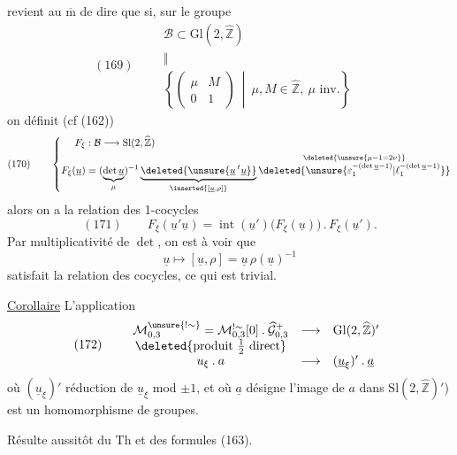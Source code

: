  revient au $\overline{\mathrm m}$ de dire que si,
sur le groupe
\[
(169)\qquad
\begin{array}{ll}
\mathcal B\subset\mathrm{Gl}(2,\widehat{\mathbb Z})&\\
\Vert&\\[-2pt]
\left\{\begin{pmatrix}\mu&M\\0&1\end{pmatrix}
\ \middle|\ \mu,M\in\widehat{\mathbb Z},\ \mu\text{ inv.}\right\}&
\end{array}
\]
on définit (cf (162))
\[
(170)\qquad
\left\{\begin{aligned}
F_\xi &: \mathcal B\longrightarrow\mathrm{Sl}(2,\widehat{\mathbb Z})\\
F_\xi(\underline u)
&=(\underbrace{\det\underline u}_{\mu})^{-1}
\underbrace{\deleted{\unsure{\underline u\,{}^t\underline u}}}
_{\inserted{[\underline u,\rho]}}
\overset{\deleted{\unsure{\mu-1=2\nu}}}
{\deleted{\unsure{\varepsilon_1^{-(\det\underline u-1)}|\ell_1^{-(\det\underline u-1)}}}}
\end{aligned}\right.
\]
alors on a la relation des 1-cocycles
\[
(171)\qquad
F_\xi(\underline u'\underline u)
=\operatorname{int}(\underline u')\bigl(F_\xi(\underline u)\bigr)
\mathbin{.}F_\xi(\underline u').
\]
Par multiplicativité de $\det$, on est 
à voir que
\[
\underline u\longmapsto[\underline u,\rho]
=\underline u\,\rho(\underline u)^{-1}
\]
satisfait la relation des cocycles, ce qui est trivial.

\uline{Corollaire} L'application
\[
(172)\qquad
\begin{array}{ccl}
\mathcal M_{0,3}^{\unsure{!\sim}}
=\mathcal M_{0,3}^{!\sim}[0]\mathbin{.}
\widehat{\mathcal G}_{0,3}^{+}
&\longrightarrow&\mathrm{Gl}(2,\widehat{\mathbb Z})'\\
\deleted{\text{produit }\tfrac12\text{ direct}}&&\\
u_\xi\mathbin{.}a&\longrightarrow&(\underline u_\xi)'\mathbin{.}\underline a
\end{array}
\]
où $(\underline u_\xi)'$  réduction de $\underline u_\xi$
mod $\pm1$, et où $\underline a$ désigne l'image de $a$ dans
$\mathrm{Sl}(2,\widehat{\mathbb Z})'$) est un homomorphisme de groupes.

Résulte aussitôt du Th et des formules (163).

